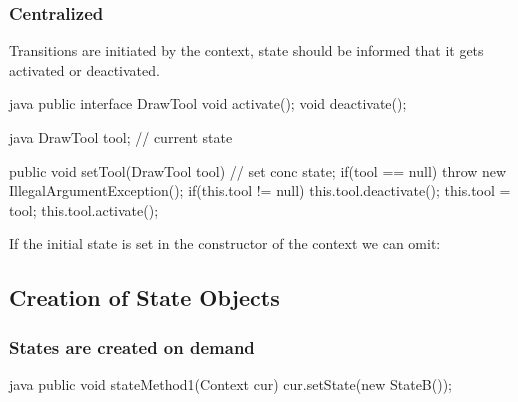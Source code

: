 \subsubsection{Centralized}
\begin{sectionbox}\nospacing
  Transitions are initiated by the context, state should be informed that it gets activated or deactivated. 
    \begin{codeboxNl}{java}
      public interface DrawTool{
        void activate();
        void deactivate();
      }
    \end{codeboxNl}
    \begin{codeboxNl}{java}
      DrawTool tool; // current state
      
      public void setTool(DrawTool tool){ // set conc state;
        if(tool == null) throw new IllegalArgumentException();
        if(this.tool != null) this.tool.deactivate();
        this.tool = tool;
        this.tool.activate();
      }
    \end{codeboxNl}
\end{sectionbox}
\begin{notebox}[Note]\nospacing
  If the initial state is set in the constructor of the context we can omit:
\end{notebox}
\subsection*{Creation of State Objects}
\subsubsection{States are created on demand}
\begin{sectionbox}\nospacing
 \begin{codebox}{java}
   public void stateMethod1(Context cur){
     cur.setState(new StateB());
   }
 \end{codebox} 
\end{sectionbox}
